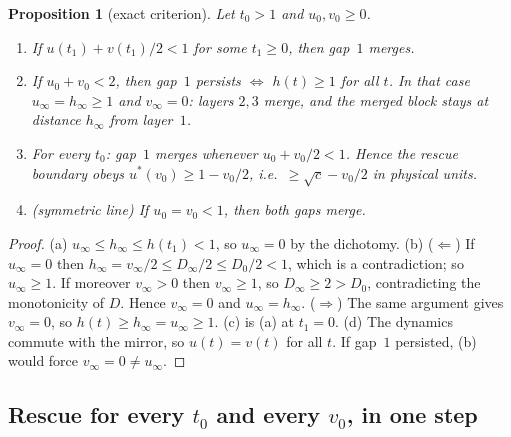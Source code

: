 \documentclass[11pt]{article}
\newtheorem{proposition}[theorem]{Proposition}
\theoremstyle{definition}
\theoremstyle{remark}
\begin{document}
\begin{proposition}[exact criterion]\label{prop:exact}
Let $t_0>1$ and $u_0,v_0\ge0$.
\begin{enumerate}[label=(\alph*)]
\item If $u(t_1)+v(t_1)/2<1$ for some $t_1\ge0$, then gap~$1$ merges.
\item If $u_0+v_0<2$, then gap~$1$ persists $\iff$ $h(t)\ge1$ for all $t$. In that case $u_\infty=h_\infty\ge1$
and $v_\infty=0$: layers $2,3$ merge, and the merged block stays at distance $h_\infty$ from layer~$1$.
\item For every $t_0$: gap~$1$ merges whenever $u_0+v_0/2<1$. Hence the rescue boundary obeys
$u^*(v_0)\ge1-v_0/2$, i.e.\ $\ge\sqrt c-v_0/2$ in physical units.
\item (symmetric line) If $u_0=v_0<1$, then both gaps merge.
\end{enumerate}
\end{proposition}
\begin{proof}
(a) $u_\infty\le h_\infty\le h(t_1)<1$, so $u_\infty=0$ by the dichotomy.
(b) ($\Leftarrow$) If $u_\infty=0$ then $h_\infty=v_\infty/2\le D_\infty/2\le D_0/2<1$, which is a contradiction;
so $u_\infty\ge1$. If moreover $v_\infty>0$ then $v_\infty\ge1$, so $D_\infty\ge2>D_0$, contradicting
the monotonicity of $D$. Hence $v_\infty=0$ and $u_\infty=h_\infty$. ($\Rightarrow$) The same argument gives
$v_\infty=0$, so $h(t)\ge h_\infty=u_\infty\ge1$.
(c) is (a) at $t_1=0$.
(d) The dynamics commute with the mirror, so $u(t)=v(t)$ for all $t$. If gap~$1$ persisted, (b) would
force $v_\infty=0\ne u_\infty$.
\end{proof}

\subsection{Rescue for every $t_0$ and every $v_0$, in one step}
\end{document}
